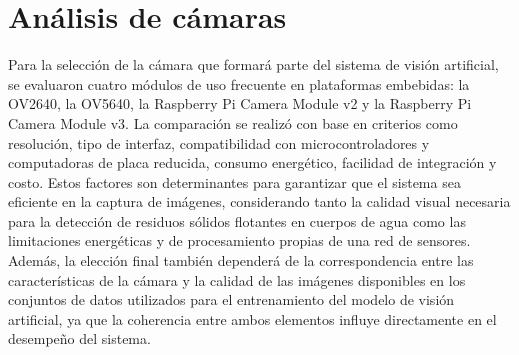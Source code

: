 \section{Análisis de cámaras}

Para la selección de la cámara que formará parte del sistema de visión artificial, se evaluaron cuatro módulos de uso frecuente en plataformas embebidas: la OV2640, la OV5640, la Raspberry Pi Camera Module v2 y la Raspberry Pi Camera Module v3. La comparación se realizó con base en criterios como resolución, tipo de interfaz, compatibilidad con microcontroladores y computadoras de placa reducida, consumo energético, facilidad de integración y costo. Estos factores son determinantes para garantizar que el sistema sea eficiente en la captura de imágenes, considerando tanto la calidad visual necesaria para la detección de residuos sólidos flotantes en cuerpos de agua como las limitaciones energéticas y de procesamiento propias de una red de sensores. Además, la elección final también dependerá de la correspondencia entre las características de la cámara y la calidad de las imágenes disponibles en los conjuntos de datos utilizados para el entrenamiento del modelo de visión artificial, ya que la coherencia entre ambos elementos influye directamente en el desempeño del sistema.







